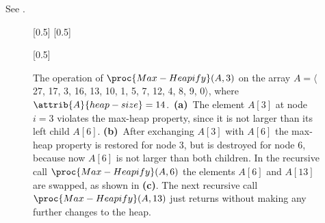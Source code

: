 See .
\begin{figure}[htb]
    \captionsetup[subfigure]{}
    \subcaptionbox{\label{fig:6.2-1a}}[0.5\textwidth]{}
    \subcaptionbox{\label{fig:6.2-1b}}[0.5\textwidth]{}
    \par\vspace{5mm}
    \subcaptionbox{\label{fig:6.2-1c}}[0.5\textwidth]{}
    \caption{The operation of $\proc{Max-Heapify}(A,3)$ on the array $A=\langle$27, 17, 3, 16, 13, 10, 1, 5, 7, 12, 4, 8, 9, 0$\rangle$, where $\attrib{A}{heap-size}=14$.\,
    \textbf{(a)}\, The element $A[3]$ at node $i=3$ violates the max-heap property, since it is not larger than its left child $A[6]$.
    \textbf{(b)}\, After exchanging $A[3]$ with $A[6]$ the max-heap property is restored for node 3, but is destroyed for node 6, because now $A[6]$ is not larger than both children.
    In the recursive call $\proc{Max-Heapify}(A,6)$ the elements $A[6]$ and $A[13]$ are swapped, as shown in \textbf{(c)}.
    The next recursive call $\proc{Max-Heapify}(A,13)$ just returns without making any further changes to the heap.} \label{fig:6.2-1}
\end{figure}
